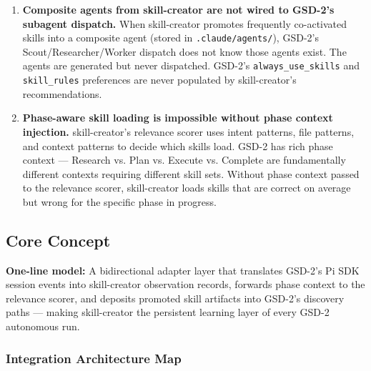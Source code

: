 \documentclass[11pt,letterpaper]{article}
\begin{document}
\begin{enumerate}
  \item \textbf{Composite agents from skill-creator are not wired to GSD-2's subagent dispatch.} When skill-creator promotes frequently co-activated skills into a composite agent (stored in \texttt{.claude/agents/}), GSD-2's Scout/Researcher/Worker dispatch does not know those agents exist. The agents are generated but never dispatched. GSD-2's \texttt{always\_use\_skills} and \texttt{skill\_rules} preferences are never populated by skill-creator's recommendations.

  \item \textbf{Phase-aware skill loading is impossible without phase context injection.} skill-creator's relevance scorer uses intent patterns, file patterns, and context patterns to decide which skills load. GSD-2 has rich phase context --- Research vs. Plan vs. Execute vs. Complete are fundamentally different contexts requiring different skill sets. Without phase context passed to the relevance scorer, skill-creator loads skills that are correct on average but wrong for the specific phase in progress.
\end{enumerate}

\subsection{Core Concept}

\textbf{One-line model:} A bidirectional adapter layer that translates GSD-2's Pi SDK session events into skill-creator observation records, forwards phase context to the relevance scorer, and deposits promoted skill artifacts into GSD-2's discovery paths --- making skill-creator the persistent learning layer of every GSD-2 autonomous run.

\subsubsection{Integration Architecture Map}
\end{document}
